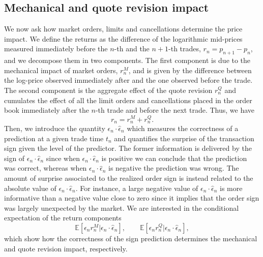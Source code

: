 \documentclass[12pt]{iopart}
\begin{document}
\subsection{Mechanical and quote revision impact}
We now ask how market orders, limits and cancellations determine the price impact. We define the returns as the difference of the logarithmic mid-prices measured immediately before the $n$-th and the $n+1$-th trades, $r_n=p_{n+1}-p_n$, and we decompose them in two components. The first component is due to the mechanical impact of market orders, $r_n^M$, and is given by the difference between the log-price observed immediately after and the one observed before the trade. The second component is the aggregate effect  of the quote revision $r_n^Q$ and cumulates the effect of all the limit orders and cancellations placed in the order book immediately after the $n$-th trade and before the next trade. Thus, we have
\begin{equation*}
  r_n=r_n^M+r_n^Q. 
\end{equation*}
Then, we introduce the quantity $\epsilon_n\cdot\hat{\epsilon}_n$ which measures the correctness of a prediction at a given trade time $t_n$ and quantifies the surprise of the transaction sign given the level of the predictor. The former information is delivered by the sign of $\epsilon_n\cdot\hat{\epsilon}_n$ since when $\epsilon_n\cdot\hat{\epsilon}_n$ is positive we can conclude that the prediction was correct, whereas when $\epsilon_n\cdot\hat{\epsilon}_n$ is negative the prediction was wrong. The amount of surprise associated to the realized order sign is instead related to the absolute value of $\epsilon_n\cdot\hat{\epsilon}_n$. For instance, a large negative value of $\epsilon_n\cdot\hat{\epsilon}_n$ is more informative than a negative value close to zero since it implies that the order sign was largely unexpected by the market. We are interested in the conditional expectation of the return components
\begin{equation*}
  \mathbb{E}[\epsilon_n r_n^M|\epsilon_n\cdot\hat{\epsilon}_n], \qquad \mathbb{E}[\epsilon_n r_n^Q|\epsilon_n\cdot\hat{\epsilon}_n],
\end{equation*}
which show how the correctness of the sign prediction determines the mechanical and quote revision impact, respectively.
\end{document}
